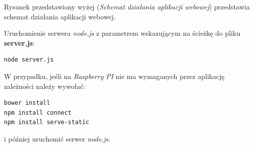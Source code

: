 \begin{center}
	\label{img:web_diagram}
\end{center}

Rysunek przedstawiony wyżej (\textit{Schemat działania aplikacji webowej}) przedstawia schemat działania aplikacji webowej.

Uruchomienie serwera \textit{node.js} z parametrem wskazującym na ścieżkę do pliku \textbf{server.js}:
\begin{lstlisting}
node server.js
\end{lstlisting}

W przypadku, jeśli na \textit{Raspberry PI} nie ma wymaganych przez aplikację zależności należy wywołać:
\begin{lstlisting}
bower install
npm install connect
npm install serve-static
\end{lstlisting}
i później uruchomić serwer \textit{node.js}.
%

